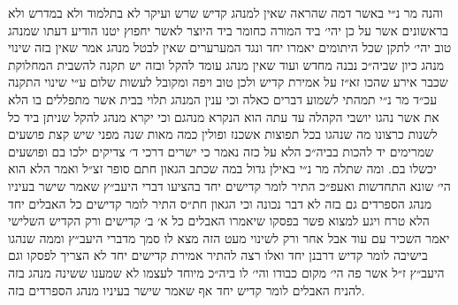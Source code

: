 \documentclass[12pt, openany]{book}
\begin{document}
\begin{multicols}{2}
והנה מר נ״י באשר דמה שהראה שאין למנהג קדיש שרש ועיקר לא בתלמוד ולא במדרש ולא בראשונים אשר על כן יהי׳ ביד המורה כחומר ביד היוצר לאשר יחפוץ יטנו הודיע דעתו שמנהג טוב יהי׳ לתקן שכל היתומים יאמרו יחד ונגד המערערים שאין לבטל מנהג אמר שאין בזה שינוי מנהג כיון שביה״כ נבנה מחדש ועוד שאין מנהג עומד להקל ובזה יש תקנה להשבית המחלוקת שכבר אירע שהכו זא״ז על אמירת קדיש ולכן טוב ויפה ומקובל לעשות שלום ע״י שינוי התקנה עכ״ד מר נ״י תמהתי לשמוע דברים כאלה וכי ענין המנהג תלוי בבית אשר מתפללים בו הלא את אשר נהגו יושבי הקהלה עד עתה הוא הנקרא מנהגם וכי יקרא מנהג להקל שניתן ביד כל לשנות כרצונו מה שנהגו בכל תפוצות אשכנז ופולין כמה מאות שנה מפני שיש קצת פושעים שמרימים יד להכות בביה״כ הלא על כזה נאמר כי ישרים דרכי ד׳ צדיקים ילכו בם ופושעים יכשלו בם. ומה שתלה מר נ״י באילן גדול במה שכתב הגאון חתם סופר זצ״ל ואמר הלא הוא הי׳ שונא התחדשות ואעפ״כ התיר לומר קדישים יחד בהציעו דברי היעב״ץ שאמר שישר בעיניו מנהג הספרדים גם בזה לא דבר נכונה וכי הגאון חת״ס התיר לומר קדישים כל האבלים יחד הלא טרח ויגע למצוא פשר בפסקו שיאמרו האבלים כל א׳ ב׳ קדישים ורק הקדיש השלישי יאמר השכיר עם עוד אבל אחר ורק לשינוי מעט הזה מצא לו סמך מדברי היעב״ץ וממה שנהגו בישיבה לומר קדיש דרבנן יחד ואלו רצה להתיר אמירת קדישים יחד לא הצריך לפסקו וגם היעב״ץ ז״ל אשר פה הי׳ מקום כבודו והי׳ לו ביה״כ מיוחד לעצמו לא שמענו ששינה מנהג בזה להניח האבלים לומר קדיש יחד אף שאמר שישר בעיניו מנהג הספרדים בזה.\\\vspace{0pt}


\end{multicols}
\end{document}
